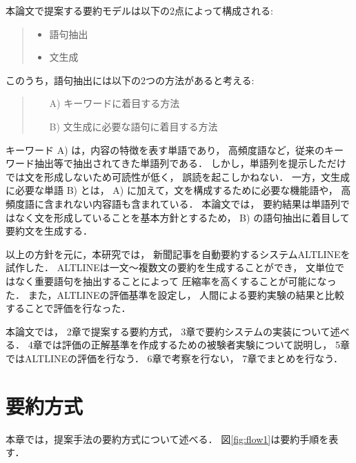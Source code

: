 本論文で提案する要約モデルは以下の2点によって構成される:

\vspace{1mm}
\begin{quote}
\begin{itemize}
 \item 語句抽出
 \item 文生成
\end{itemize}
\end{quote}
\vspace{1mm}

このうち，語句抽出には以下の2つの方法があると考える:

\vspace{1mm}
\begin{quote}
\begin{itemize}
\item[A)] キーワードに着目する方法
\vspace{1mm}
\item[B)] 文生成に必要な語句に着目する方法
\end{itemize}
\end{quote}
\vspace{1mm}

キーワード A) は，内容の特徴を表す単語であり，
高頻度語など，従来のキーワード抽出等で抽出されてきた単語列である．
しかし，単語列を提示しただけでは文を形成しないため可読性が低く，
誤読を起こしかねない．
一方，文生成に必要な単語 B) とは，
A) に加えて，文を構成するために必要な機能語や，
高頻度語に含まれない内容語も含まれている．
本論文では，
要約結果は単語列ではなく文を形成していることを基本方針とするため，
B) の語句抽出に着目して要約文を生成する．

以上の方針を元に，本研究では，
新聞記事を自動要約するシステムALTLINEを試作した．
ALTLINEは一文〜複数文の要約を生成することができ，
文単位ではなく重要語句を抽出することによって
圧縮率を高くすることが可能になった．
また，ALTLINEの評価基準を設定し，
人間による要約実験の結果と比較することで評価を行なった．

本論文では，
2章で提案する要約方式，
3章で要約システムの実装について述べる．
4章では評価の正解基準を作成するための被験者実験について説明し，
5章ではALTLINEの評価を行なう．
6章で考察を行ない，
7章でまとめを行なう．

\section{要約方式}
\label{sec:Summarization method}

本章では，提案手法の要約方式について述べる．
図\ref{fig:flow1}は要約手順を表す．

